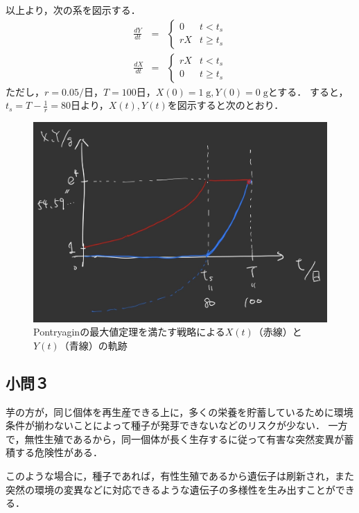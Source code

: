 \documentclass[uplatex, dvipdfmx]{jsarticle}
\begin{document}
以上より，次の系を図示する．
\begin{eqnarray*}
    \frac{dY}{dt} &=& \begin{cases}
        0 & t< t_s \\
        rX & t\ge t_s
    \end{cases}\\
    \frac{dX}{dt} &=& \begin{cases}
        rX & t< t_s \\
        0 & t\ge t_s
    \end{cases}
\end{eqnarray*}
ただし，$r=0.05/$日，$T=100$日，$X(0)=1\;\mathrm{g},Y(0)=0\;\mathrm{g}$とする．
すると，$t_s=T-\frac{1}{r}=80$日より，$X(t),Y(t)$を図示すると次のとおり．
\begin{center}
    \begin{figure}[h]\caption{Pontryaginの最大値定理を満たす戦略による$X(t)$（赤線）と$Y(t)$（青線）の軌跡} \centering
        \includegraphics[width=17cm]{figure.JPG}
    \end{figure}
\end{center}

\subsection{小問３}

芋の方が，同じ個体を再生産できる上に，多くの栄養を貯蓄しているために環境条件が揃わないことによって種子が発芽できないなどのリスクが少ない．
一方で，無性生殖であるから，同一個体が長く生存するに従って有害な突然変異が蓄積する危険性がある．

このような場合に，種子であれば，有性生殖であるから遺伝子は刷新され，また突然の環境の変異などに対応できるような遺伝子の多様性を生み出すことができる．
\end{document}
